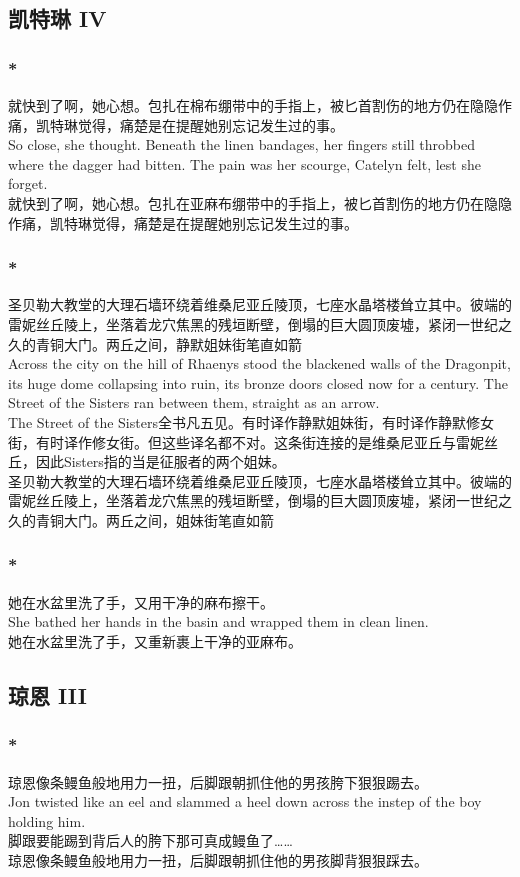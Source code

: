 \documentclass[12pt,a4paper]{article}
\newcommand{\h}[1]{{\color{red}#1}\\}
\newcommand{\la}[1]{{\color{blue}#1}\\}
\begin{document}
	\subsection{凯特琳 IV}
	\subsubsection{\color{red}*}\la{
		就快到了啊，她心想。包扎在棉布绷带中的手指上，被匕首割伤的地方仍在隐隐作痛，凯特琳觉得，痛楚是在提醒她别忘记发生过的事。\\
		So close, she thought. Beneath the linen bandages, her fingers still throbbed where the dagger had bitten. The pain was her scourge, Catelyn felt, lest she forget.}
		就快到了啊，她心想。包扎在亚麻布绷带中的手指上，被匕首割伤的地方仍在隐隐作痛，凯特琳觉得，痛楚是在提醒她别忘记发生过的事。
	
\subsubsection{\color{red}*}\la{
	圣贝勒大教堂的大理石墙环绕着维桑尼亚丘陵顶，七座水晶塔楼耸立其中。彼端的雷妮丝丘陵上，坐落着龙穴焦黑的残垣断壁，倒塌的巨大圆顶废墟，紧闭一世纪之久的青铜大门。两丘之间，静默姐妹街笔直如箭\\
	Across the city on the hill of Rhaenys stood the blackened walls of the Dragonpit, its huge dome collapsing into ruin, its bronze doors closed now for a century. The Street of the Sisters ran between them, straight as an arrow.}\h{
	The Street of the Sisters全书凡五见。有时译作静默姐妹街，有时译作静默修女街，有时译作修女街。但这些译名都不对。这条街连接的是维桑尼亚丘与雷妮丝丘，因此Sisters指的当是征服者的两个姐妹。}
	圣贝勒大教堂的大理石墙环绕着维桑尼亚丘陵顶，七座水晶塔楼耸立其中。彼端的雷妮丝丘陵上，坐落着龙穴焦黑的残垣断壁，倒塌的巨大圆顶废墟，紧闭一世纪之久的青铜大门。两丘之间，姐妹街笔直如箭
	
\subsubsection{\color{red}*}\la{
			她在水盆里洗了手，又用干净的麻布擦干。\\
			She bathed her hands in the basin and wrapped them in clean linen.}
			她在水盆里洗了手，又重新裹上干净的亚麻布。
			
\subsection{琼恩 III}
\subsubsection{\color{red}*}\la{
	琼恩像条鳗鱼般地用力一扭，后脚跟朝抓住他的男孩胯下狠狠踢去。\\
	Jon twisted like an eel and slammed a heel down across the instep of the boy holding him.}\h{
	脚跟要能踢到背后人的胯下那可真成鳗鱼了……}
	琼恩像条鳗鱼般地用力一扭，后脚跟朝抓住他的男孩脚背狠狠踩去。
	
\end{document}
